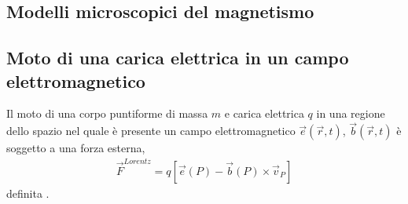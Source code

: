 \documentclass[letterpaper,10pt,italian]{jupyterBook}
\begin{document}
\subsection{Modelli microscopici del magnetismo}
\label{\detokenize{ch/electromagnetism/electromagnetism-steady:modelli-microscopici-del-magnetismo}}\label{\detokenize{ch/electromagnetism/electromagnetism-steady:physics-hs-electromagnetism-magnetism-micro}}
\sphinxAtStartPar
{}   

\sphinxAtStartPar
{}

\sphinxAtStartPar
{} 


\subsection{Moto di una carica elettrica in un campo elettromagnetico}
\label{\detokenize{ch/electromagnetism/electromagnetism-steady:moto-di-una-carica-elettrica-in-un-campo-elettromagnetico}}\label{\detokenize{ch/electromagnetism/electromagnetism-steady:physics-hs-electromagnetism-lorentz}}
\sphinxAtStartPar
Il moto di una corpo puntiforme di massa \(m\) e carica elettrica \(q\) in una regione dello spazio nel quale è presente un campo elettromagnetico \(\vec{e}(\vec{r},t)\), \(\vec{b}(\vec{r},t)\) è soggetto a una forza esterna,
\begin{equation}\label{equation:ch/electromagnetism/electromagnetism-steady:eq:force:lorentz}
\begin{split}\vec{F}^{Lorentz} = q \left[\vec{e}(P) - \vec{b}(P) \times \vec{v}_P \right]\end{split}
\end{equation}
\sphinxAtStartPar
definita .
\end{document}
